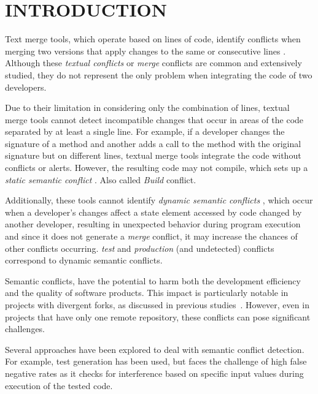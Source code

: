 \documentclass[sigconf,review]{acmart}
\begin{document}
\section{INTRODUCTION}

Text merge tools, which operate based on lines of code, identify conflicts when merging two versions that apply changes to the same or consecutive lines \cite{accioly2018understanding}. Although these \emph{textual conflicts} or \emph{merge} conflicts are common and extensively studied, they do not represent the only problem when integrating the code of two developers.

Due to their limitation in considering only the combination of lines, textual merge tools cannot detect incompatible changes that occur in areas of the code separated by at least a single line. For example, if a developer changes the signature of a method and another adds a call to the method with the original signature but on different lines, textual merge tools integrate the code without conflicts or alerts. However, the resulting code may not compile, which sets up a \emph{static semantic conflict} \cite{sarma2011palantir, brun2013early, towqir2022detecting, silva2022detecting, zhang2022using,sung2020towards}. Also called \emph{Build} conflict.

Additionally, these tools cannot identify \emph{dynamic semantic conflicts} \cite{Horwitz1989IntegratingNV, yang1992program, shao2009sca, brun2013early, pastore2017bdci, barros2017using, sousa2018verified, da2020detecting, zhang2022using}, which occur when a developer's changes affect a state element accessed by code changed by another developer, resulting in unexpected behavior during program execution and since it does not generate a \textit{merge} conflict, it may increase the chances of other \cite{lima2014abordagem} conflicts occurring. \emph{test} and \emph{production} (and undetected) conflicts correspond to dynamic semantic conflicts.

Semantic conflicts, have the potential to harm both the development efficiency and the quality of software products. This impact is particularly notable in projects with divergent forks, as discussed in previous studies~\cite{sung2020towards, zhang2022using, mens2002state, zimmermann2007mining, bird2012assessing, brun2013early}. However, even in projects that have only one remote repository, these conflicts can pose significant challenges.

Several approaches have been explored to deal with semantic conflict detection. For example, \cite{silva2022detecting} test generation has been used, but faces the challenge of high false negative rates as it checks for interference based on specific input values during execution of the tested code.
\end{document}
